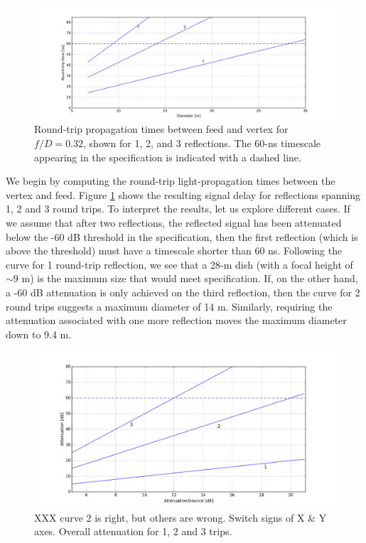 \documentclass[11pt]{article}
\begin{document}
\begin{figure}[h]
\centering
\includegraphics[width=1.0\textwidth]{roundtrip.png}
\caption{Round-trip propagation times between feed and vertex for $f/D=0.32$, 
shown for 1, 2, and 3 reflections.  The 60-ns timescale appearing in the specification
is indicated with a dashed line.}
\label{fig:roundtrip}
\end{figure}

We begin by computing the round-trip light-propagation times between the vertex and feed.  Figure
\ref{fig:roundtrip} shows the resulting signal delay for reflections spanning 1, 2 and
3 round trips.  To interpret the results, let us explore different cases.
If we assume that after two reflections, the reflected signal has been attenuated
below the -60 dB threshold in the specification, then the first reflection (which is above the
threshold) must have a timescale shorter than 60 ns.  Following the curve for 1 round-trip
reflection, we see that a 28-m dish (with a focal height of $\sim9$ m) is the maximum size
that would meet specification.  If, on the other hand, a -60 dB attenuation is only achieved on the
third reflection, then the curve for 2 round trips suggests a maximum diameter of 14 m.  Similarly,
requiring the attenuation associated with one more reflection moves the maximum diameter down
to 9.4 m.

\begin{figure}[h]
\centering
\includegraphics[width=1.0\textwidth]{bounces.png}
\caption{XXX curve 2 is right, but others are wrong.  Switch signs of X & Y axes.
Overall attenuation for 1, 2 and 3 trips.
} \label{fig:bounces}
\end{figure}
\end{document}
